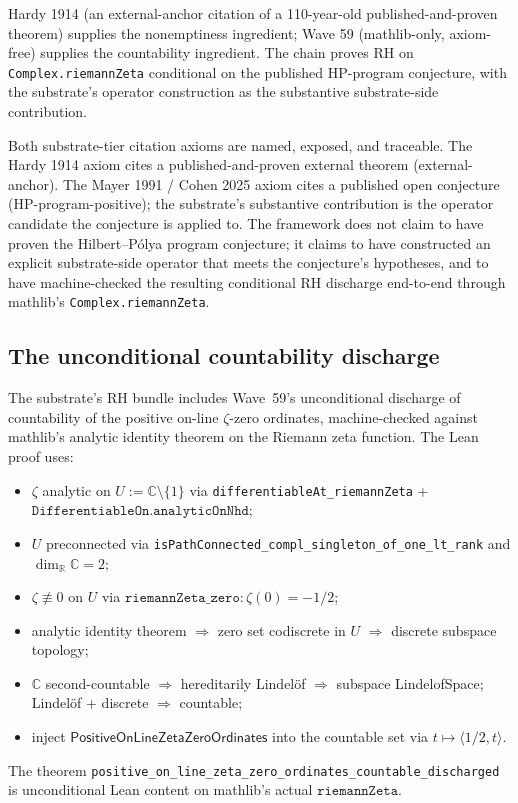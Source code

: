 \documentclass[11pt,a4paper]{amsart}
\theoremstyle{plain}
\theoremstyle{definition}
\begin{document}
\begin{description}[font=\normalfont\bfseries,leftmargin=2em,itemsep=4pt]
Hardy 1914 (an external-anchor citation of a 110-year-old published-and-proven theorem) supplies the nonemptiness ingredient; Wave 59 (mathlib-only, axiom-free) supplies the countability ingredient. The chain proves RH on \texttt{Complex.riemannZeta} conditional on the published HP-program conjecture, with the substrate's operator construction as the substantive substrate-side contribution.
\end{description}

Both substrate-tier citation axioms are named, exposed, and traceable. The Hardy 1914 axiom cites a published-and-proven external theorem (external-anchor). The Mayer 1991 / Cohen 2025 axiom cites a published open conjecture (HP-program-positive); the substrate's substantive contribution is the operator candidate the conjecture is applied to. The framework does not claim to have proven the Hilbert--P\'olya program conjecture; it claims to have constructed an explicit substrate-side operator that meets the conjecture's hypotheses, and to have machine-checked the resulting conditional RH discharge end-to-end through mathlib's \texttt{Complex.riemannZeta}.

\subsection{The unconditional countability discharge}

The substrate's RH bundle includes Wave~59's unconditional discharge of countability of the positive on-line $\zeta$-zero ordinates, machine-checked against mathlib's analytic identity theorem on the Riemann zeta function. The Lean proof uses:
\begin{itemize}[itemsep=2pt]
\item $\zeta$ analytic on $U := \mathbb{C}\setminus\{1\}$ via \texttt{differentiableAt\_riemannZeta} + $\texttt{DifferentiableOn.analyticOnNhd}$;
\item $U$ preconnected via \texttt{isPathConnected\_compl\_singleton\_of\_one\_lt\_rank} and $\dim_{\mathbb{R}}\mathbb{C} = 2$;
\item $\zeta \not\equiv 0$ on $U$ via $\texttt{riemannZeta\_zero} : \zeta(0) = -1/2$;
\item analytic identity theorem $\Rightarrow$ zero set codiscrete in $U$ $\Rightarrow$ discrete subspace topology;
\item $\mathbb{C}$ second-countable $\Rightarrow$ hereditarily Lindel\"of $\Rightarrow$ subspace LindelofSpace; Lindel\"of + discrete $\Rightarrow$ countable;
\item inject $\textsf{PositiveOnLineZetaZeroOrdinates}$ into the countable set via $t \mapsto \langle 1/2, t\rangle$.
\end{itemize}
The theorem \texttt{positive\_on\_line\_zeta\_zero\_ordinates\_countable\_discharged} is unconditional Lean content on mathlib's actual $\texttt{riemannZeta}$.
\end{document}
